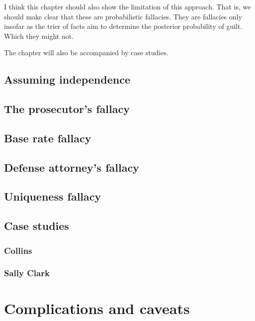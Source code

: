 \documentclass[]{book}
\begin{document}
I think this chapter should also show the limitation of this approach.
That is, we should make clear that these are probabilistic fallacies.
They are fallacies only insofar as the trier of facts aim to determine
the posterior probability of guilt. Which they might not.

The chapter will also be accompanied by case studies.

\section{Assuming independence}

\section{The prosecutor's fallacy}

\section{Base rate fallacy}

\section{Defense attorney's fallacy}

\section{Uniqueness fallacy}

\section{Case studies}

\subsection{Collins}

\subsection{Sally Clark}

\chapter{Complications and caveats}

\end{document}
